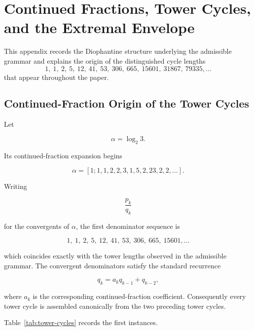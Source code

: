 \documentclass[12pt, oneside]{article}
\numberwithin{equation}{section}
\theoremstyle{definition}
\theoremstyle{plain}
\theoremstyle{remark}
\begin{document}
\newpage
\section{Continued Fractions, Tower Cycles, and the Extremal Envelope}
\label{app:continued-fractions}

This appendix records the Diophantine structure underlying the admissible
grammar and explains the origin of the distinguished cycle lengths
\[
1,\ 1,\ 2,\ 5,\ 12,\ 41,\ 53,\ 306,\ 665,\ 15601,\ 31867,\ 79335,\ldots
\]
that appear throughout the paper.

\subsection{Continued-Fraction Origin of the Tower Cycles}

Let

\[
\alpha=\log_2 3.
\]

Its continued-fraction expansion begins

\[
\alpha=[1;1,1,2,2,3,1,5,2,23,2,2,\dots].
\]

Writing

\[
\frac{p_k}{q_k}
\]

for the convergents of $\alpha$, the first denominator sequence is

\[
1,\ 1,\ 2,\ 5,\ 12,\ 41,\ 53,\ 306,\ 665,\ 15601,\ldots
\]

which coincides exactly with the tower lengths observed in the admissible grammar.
The convergent denominators satisfy the standard recurrence

\[
q_k=a_k q_{k-1}+q_{k-2},
\]

where $a_k$ is the corresponding continued-fraction coefficient.
Consequently every tower cycle is assembled canonically from the two
preceding tower cycles.

Table~\ref{tab:tower-cycles} records the first instances.
\end{document}
